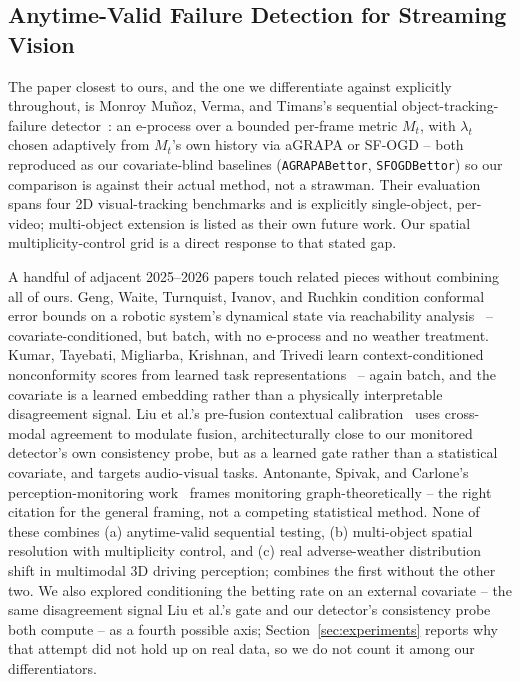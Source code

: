 \subsection{Anytime-Valid Failure Detection for Streaming Vision}

The paper closest to ours, and the one we differentiate against explicitly throughout, is Monroy Mu\~noz, Verma, and Timans's sequential object-tracking-failure detector~\cite{MonroyMunoz2026WACV}: an e-process over a bounded per-frame metric $M_t$, with $\lambda_t$ chosen adaptively from $M_t$'s own history via aGRAPA or SF-OGD -- both reproduced as our covariate-blind baselines (\texttt{AGRAPABettor}, \texttt{SFOGDBettor}) so our comparison is against their actual method, not a strawman. Their evaluation spans four 2D visual-tracking benchmarks and is explicitly single-object, per-video; multi-object extension is listed as their own future work. Our spatial multiplicity-control grid is a direct response to that stated gap.

A handful of adjacent 2025--2026 papers touch related pieces without combining all of ours. Geng, Waite, Turnquist, Ivanov, and Ruchkin condition conformal error bounds on a robotic system's dynamical state via reachability analysis~\cite{Geng2025StateDependent} -- covariate-conditioned, but batch, with no e-process and no weather treatment. Kumar, Tayebati, Migliarba, Krishnan, and Trivedi learn context-conditioned nonconformity scores from learned task representations~\cite{Kumar2025ContextAware} -- again batch, and the covariate is a learned embedding rather than a physically interpretable disagreement signal. Liu et al.'s pre-fusion contextual calibration~\cite{Liu2026ValueGated} uses cross-modal agreement to modulate fusion, architecturally close to our monitored detector's own consistency probe, but as a learned gate rather than a statistical covariate, and targets audio-visual tasks. Antonante, Spivak, and Carlone's perception-monitoring work~\cite{Antonante2020Monitoring} frames monitoring graph-theoretically -- the right citation for the general framing, not a competing statistical method. None of these combines (a) anytime-valid sequential testing, (b) multi-object spatial resolution with multiplicity control, and (c) real adverse-weather distribution shift in multimodal 3D driving perception; \cite{MonroyMunoz2026WACV} combines the first without the other two. We also explored conditioning the betting rate on an external covariate -- the same disagreement signal Liu et al.'s gate and our detector's consistency probe both compute -- as a fourth possible axis; Section~\ref{sec:experiments} reports why that attempt did not hold up on real data, so we do not count it among our differentiators.


